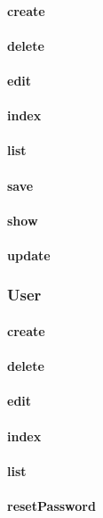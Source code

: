 \documentclass[12pt]{article}
\begin{document}
\paragraph{create}
\paragraph{delete}
\paragraph{edit}
\paragraph{index}
\paragraph{list}
\paragraph{save}
\paragraph{show}
\paragraph{update}

\subsubsection{User}\label{sec:CUser}
\paragraph{create}
\paragraph{delete}
\paragraph{edit}
\paragraph{index}
\paragraph{list}
\paragraph{resetPassword}
\end{document}
